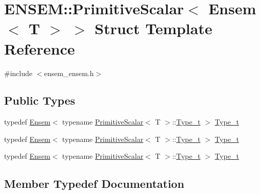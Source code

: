 \hypertarget{structENSEM_1_1PrimitiveScalar_3_01Ensem_3_01T_01_4_01_4}{}\section{E\+N\+S\+EM\+:\+:Primitive\+Scalar$<$ Ensem$<$ T $>$ $>$ Struct Template Reference}
\label{structENSEM_1_1PrimitiveScalar_3_01Ensem_3_01T_01_4_01_4}


{\ttfamily \#include $<$ensem\+\_\+ensem.\+h$>$}

\subsection*{Public Types}
\begin{DoxyCompactItemize}
\item 
typedef \mbox{\hyperlink{classENSEM_1_1Ensem}{Ensem}}$<$ typename \mbox{\hyperlink{structENSEM_1_1PrimitiveScalar}{Primitive\+Scalar}}$<$ T $>$\+::\mbox{\hyperlink{structENSEM_1_1PrimitiveScalar_3_01Ensem_3_01T_01_4_01_4_af9a7554dcb219c3d60465d27682b73bf}{Type\+\_\+t}} $>$ \mbox{\hyperlink{structENSEM_1_1PrimitiveScalar_3_01Ensem_3_01T_01_4_01_4_af9a7554dcb219c3d60465d27682b73bf}{Type\+\_\+t}}
\item 
typedef \mbox{\hyperlink{classENSEM_1_1Ensem}{Ensem}}$<$ typename \mbox{\hyperlink{structENSEM_1_1PrimitiveScalar}{Primitive\+Scalar}}$<$ T $>$\+::\mbox{\hyperlink{structENSEM_1_1PrimitiveScalar_3_01Ensem_3_01T_01_4_01_4_af9a7554dcb219c3d60465d27682b73bf}{Type\+\_\+t}} $>$ \mbox{\hyperlink{structENSEM_1_1PrimitiveScalar_3_01Ensem_3_01T_01_4_01_4_af9a7554dcb219c3d60465d27682b73bf}{Type\+\_\+t}}
\item 
typedef \mbox{\hyperlink{classENSEM_1_1Ensem}{Ensem}}$<$ typename \mbox{\hyperlink{structENSEM_1_1PrimitiveScalar}{Primitive\+Scalar}}$<$ T $>$\+::\mbox{\hyperlink{structENSEM_1_1PrimitiveScalar_3_01Ensem_3_01T_01_4_01_4_af9a7554dcb219c3d60465d27682b73bf}{Type\+\_\+t}} $>$ \mbox{\hyperlink{structENSEM_1_1PrimitiveScalar_3_01Ensem_3_01T_01_4_01_4_af9a7554dcb219c3d60465d27682b73bf}{Type\+\_\+t}}
\end{DoxyCompactItemize}


\subsection{Member Typedef Documentation}
\mbox{\label{structENSEM_1_1PrimitiveScalar_3_01Ensem_3_01T_01_4_01_4_af9a7554dcb219c3d60465d27682b73bf}} 
